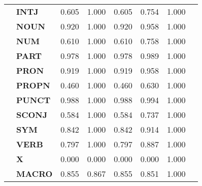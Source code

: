 \begin{longtable}{|l||l||l||l||l||l||l||l|}
\textbf{} & \textbf{INTJ} & 0.605 & 1.000 & 0.605 & 0.754 & 1.000 \\
\textbf{} & \textbf{NOUN} & 0.920 & 1.000 & 0.920 & 0.958 & 1.000 \\
\textbf{} & \textbf{NUM} & 0.610 & 1.000 & 0.610 & 0.758 & 1.000 \\
\textbf{} & \textbf{PART} & 0.978 & 1.000 & 0.978 & 0.989 & 1.000 \\
\textbf{} & \textbf{PRON} & 0.919 & 1.000 & 0.919 & 0.958 & 1.000 \\
\textbf{} & \textbf{PROPN} & 0.460 & 1.000 & 0.460 & 0.630 & 1.000 \\
\textbf{} & \textbf{PUNCT} & 0.988 & 1.000 & 0.988 & 0.994 & 1.000 \\
\textbf{} & \textbf{SCONJ} & 0.584 & 1.000 & 0.584 & 0.737 & 1.000 \\
\textbf{} & \textbf{SYM} & 0.842 & 1.000 & 0.842 & 0.914 & 1.000 \\
\textbf{} & \textbf{VERB} & 0.797 & 1.000 & 0.797 & 0.887 & 1.000 \\
\textbf{} & \textbf{X} & 0.000 & 0.000 & 0.000 & 0.000 & 1.000 \\
\textbf{} & \textbf{MACRO} & 0.855 & 0.867 & 0.855 & 0.851 & 1.000 \\
\cline{1-7}
\end{longtable}
